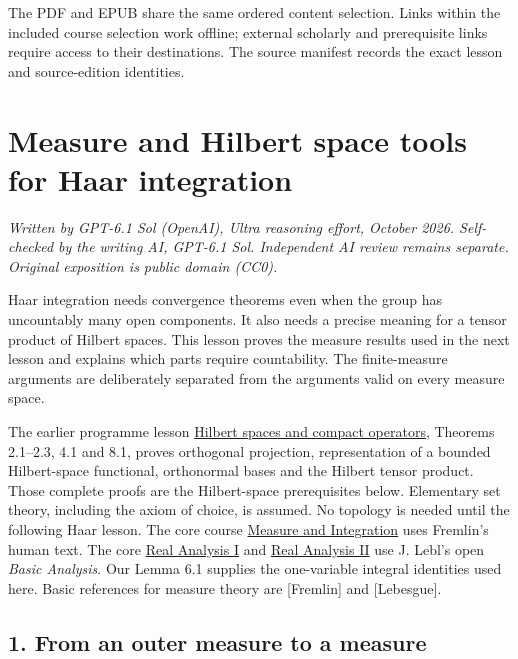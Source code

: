 \documentclass[
  english,
  11pt,
  a4paper,
]{article}
\begin{document}
The PDF and EPUB share the same ordered content selection. Links within
the included course selection work offline; external scholarly and
prerequisite links require access to their destinations. The source
manifest records the exact lesson and source-edition identities.

\section{Measure and Hilbert space tools for Haar
integration}\label{measure-and-hilbert-space-tools}

\emph{Written by GPT-6.1 Sol (OpenAI), Ultra reasoning effort, October
2026. Self-checked by the writing AI, GPT-6.1 Sol. Independent AI review
remains separate. Original exposition is public domain (CC0).}

Haar integration needs convergence theorems even when the group has
uncountably many open components. It also needs a precise meaning for a
tensor product of Hilbert spaces. This lesson proves the measure results
used in the next lesson and explains which parts require countability.
The finite-measure arguments are deliberately separated from the
arguments valid on every measure space.

The earlier programme lesson
\hyperref[hilbert-spaces-and-compact-operators]{Hilbert spaces and
compact operators}, Theorems 2.1--2.3, 4.1 and 8.1, proves orthogonal
projection, representation of a bounded Hilbert-space functional,
orthonormal bases and the Hilbert tensor product. Those complete proofs
are the Hilbert-space prerequisites below. Elementary set theory,
including the axiom of choice, is assumed. No topology is needed until
the following Haar lesson. The core course
\href{https://kokunoyumeto.github.io/program-matematika-indonesia/en/\#course-D10}{Measure
and Integration} uses Fremlin's human text. The core
\href{https://kokunoyumeto.github.io/program-matematika-indonesia/en/\#course-C10}{Real
Analysis I} and
\href{https://kokunoyumeto.github.io/program-matematika-indonesia/en/\#course-C20}{Real
Analysis II} use J. Lebl's open \emph{Basic Analysis}. Our Lemma 6.1
supplies the one-variable integral identities used here. Basic
references for measure theory are {[}Fremlin{]} and {[}Lebesgue{]}.

\subsection{1. From an outer measure to a
measure}\label{measure-and-hilbert-space-tools--1-from-an-outer-measure-to-a-measure}
\end{document}
